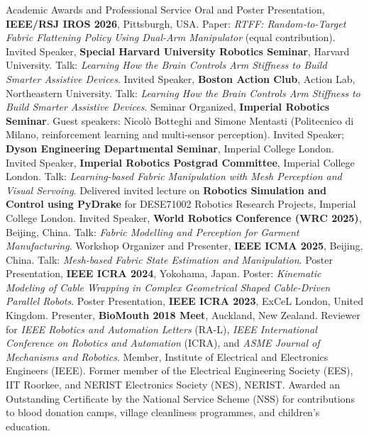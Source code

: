 \begin{rubric}{Academic Awards and Professional Service}
\entry*[27/09/26] Oral and Poster Presentation, \textbf{IEEE/RSJ IROS 2026}, Pittsburgh, USA. Paper: \textit{RTFF: Random-to-Target Fabric Flattening Policy Using Dual-Arm Manipulator} (equal contribution).
\entry*[24/09/26] Invited Speaker, \textbf{Special Harvard University Robotics Seminar}, Harvard University. Talk: \textit{Learning How the Brain Controls Arm Stiffness to Build Smarter Assistive Devices}.
\entry*[23/09/26] Invited Speaker, \textbf{Boston Action Club}, Action Lab, Northeastern University. Talk: \textit{Learning How the Brain Controls Arm Stiffness to Build Smarter Assistive Devices}.
\entry*[27/08/26] Seminar Organized, \textbf{Imperial Robotics Seminar}. Guest speakers: Nicol\`o Botteghi and Simone Mentasti (Politecnico di Milano, reinforcement learning and multi-sensor perception).
\entry*[05/02/26] Invited Speaker; \textbf{Dyson Engineering Departmental Seminar}, Imperial College London.
\entry*[29/01/26] Invited Speaker, \textbf{Imperial Robotics Postgrad Committee}, Imperial College London. Talk: \textit{Learning-based Fabric Manipulation with Mesh Perception and Visual Servoing}.
\entry*[28/01/26] Delivered invited lecture on \textbf{Robotics Simulation and Control using PyDrake} for DESE71002 Robotics Research Projects, Imperial College London.
\entry*[08/08/25] Invited Speaker, \textbf{World Robotics Conference (WRC 2025)}, Beijing, China. Talk: \textit{Fabric Modelling and Perception for Garment Manufacturing}.
\entry*[03/08/25] Workshop Organizer and Presenter, \textbf{IEEE ICMA 2025}, Beijing, China. Talk: \textit{Mesh-based Fabric State Estimation and Manipulation}.
\entry*[13/05/24] Poster Presentation, \textbf{IEEE ICRA 2024}, Yokohama, Japan. Poster: \textit{Kinematic Modeling of Cable Wrapping in Complex Geometrical Shaped Cable-Driven Parallel Robots}.
\entry*[29/05/23] Poster Presentation, \textbf{IEEE ICRA 2023}, ExCeL London, United Kingdom.
\entry*[2018] Presenter, \textbf{BioMouth 2018 Meet}, Auckland, New Zealand.
\entry*[2021 -- Present] Reviewer for \textit{IEEE Robotics and Automation Letters} (RA-L), \textit{IEEE International Conference on Robotics and Automation} (ICRA), and \textit{ASME Journal of Mechanisms and Robotics}.
%
\entry*[2017 -- Present] Member, Institute of Electrical and Electronics Engineers (IEEE).
\entry*[2014] Former member of the Electrical Engineering Society (EES), IIT Roorkee, and NERIST Electronics Society (NES), NERIST.
\entry*[2006] Awarded an Outstanding Certificate by the National Service Scheme (NSS) for contributions to blood donation camps, village cleanliness programmes, and children's education.
\end{rubric}